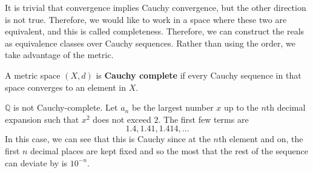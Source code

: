   It is trivial that convergence implies Cauchy convergence, but the other direction is not true. Therefore, we would like to work in a space where these two are equivalent, and this is called completeness. Therefore, we can construct the reals as equivalence classes over Cauchy sequences. Rather than using the order, we take advantage of the metric. 

  \begin{definition}
    A metric space $(X, d)$ is \textbf{Cauchy complete} if every Cauchy sequence in that space converges to an element in $X$. 
  \end{definition} 
  
  $\mathbb{Q}$ is not Cauchy-complete. Let $a_n$ be the largest number $x$ up to the $n$th decimal expansion such that $x^2$ does not exceed $2$. The first few terms are 
  \begin{equation}
    1.4, 1.41, 1.414, \ldots
  \end{equation}
  In this case, we can see that this is Cauchy since at the $n$th element and on, the first $n$ decimal places are kept fixed and so the most that the rest of the sequence can deviate by is $10^{-n}$. 

